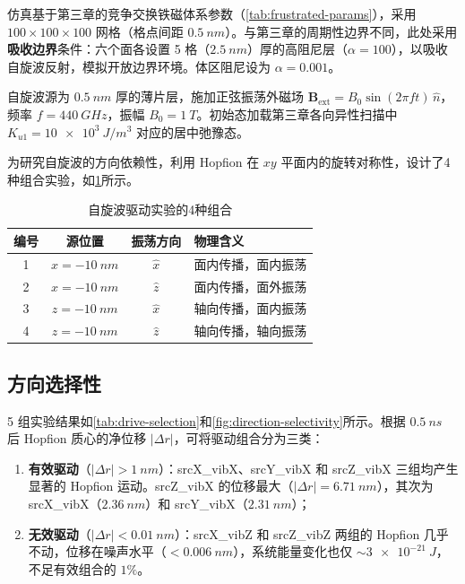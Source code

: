 仿真基于第三章的竞争交换铁磁体系参数（\cref{tab:frustrated-params}），采用 $100 \times 100 \times 100$ 网格（格点间距 $\SI{0.5}{nm}$）。与第三章的周期性边界不同，此处采用\textbf{吸收边界}条件：六个面各设置 5 格（$\SI{2.5}{nm}$）厚的高阻尼层（$\alpha = 100$），以吸收自旋波反射，模拟开放边界环境。体区阻尼设为 $\alpha = 0.001$。

自旋波源为 $\SI{0.5}{nm}$ 厚的薄片层，施加正弦振荡外磁场 $\mathbf{B}_{\text{ext}} = B_0 \sin(2\pi f t) \, \hat{n}$，频率 $f = \SI{440}{GHz}$，振幅 $B_0 = \SI{1}{T}$。初始态加载第三章各向异性扫描中 $K_{u1} = \SI{10e3}{J/m^3}$ 对应的居中弛豫态。

为研究自旋波的方向依赖性，利用 Hopfion 在 $xy$ 平面内的旋转对称性，设计了4种组合实验，如\cref{tab:sw-combos}所示。

\begin{table}[htbp]
  \centering
  \caption{自旋波驱动实验的4种组合}
  \label{tab:sw-combos}
  \begin{tabular}{cccl}
    \toprule
    编号 & 源位置 & 振荡方向 & 物理含义 \\
    \midrule
    1 & $x = -\SI{10}{nm}$ & $\hat{x}$ & 面内传播，面内振荡 \\
    2 & $x = -\SI{10}{nm}$ & $\hat{z}$ & 面内传播，面外振荡 \\
    3 & $z = -\SI{10}{nm}$ & $\hat{x}$ & 轴向传播，面内振荡 \\
    4 & $z = -\SI{10}{nm}$ & $\hat{z}$ & 轴向传播，轴向振荡 \\
    \bottomrule
  \end{tabular}
\end{table}

\subsection{方向选择性}

5 组实验结果如\cref{tab:drive-selection}和\cref{fig:direction-selectivity}所示。根据 $\SI{0.5}{ns}$ 后 Hopfion 质心的净位移 $|\Delta r|$，可将驱动组合分为三类：

\begin{enumerate}
  \item \textbf{有效驱动}（$|\Delta r| > \SI{1}{nm}$）：srcX\_vibX、srcY\_vibX 和 srcZ\_vibX 三组均产生显著的 Hopfion 运动。srcZ\_vibX 的位移最大（$|\Delta r| = \SI{6.71}{nm}$），其次为 srcX\_vibX（$\SI{2.36}{nm}$）和 srcY\_vibX（$\SI{2.31}{nm}$）；
  \item \textbf{无效驱动}（$|\Delta r| < \SI{0.01}{nm}$）：srcX\_vibZ 和 srcZ\_vibZ 两组的 Hopfion 几乎不动，位移在噪声水平（$< \SI{0.006}{nm}$），系统能量变化也仅 $\sim\SI{3e-21}{J}$，不足有效组合的 $1\%$。
\end{enumerate}

